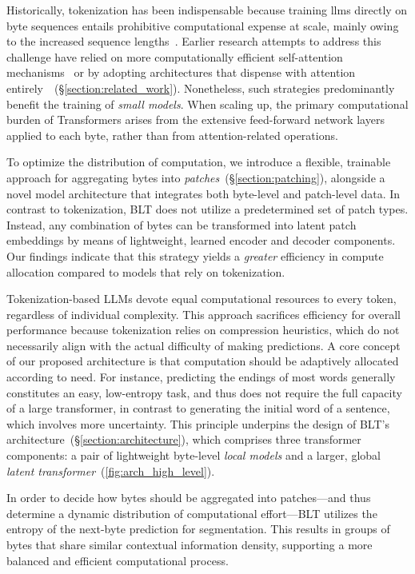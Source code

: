 Historically, tokenization has been indispensable because training llms directly on byte sequences entails prohibitive computational expense at scale, mainly owing to the increased sequence lengths~\citep{xue2022byt5}. Earlier research attempts to address this challenge have relied on more computationally efficient self-attention mechanisms~\citep{el2020characterbert, clark2022canine} or by adopting architectures that dispense with attention entirely~\citep{wang2024mambabyte}~(\S\ref{section:related_work}). Nonetheless, such strategies predominantly benefit the training of \textit{small models}. When scaling up, the primary computational burden of Transformers arises from the extensive feed-forward network layers applied to each byte, rather than from attention-related operations.

To optimize the distribution of computation, we introduce a flexible, trainable approach for aggregating bytes into \textit{patches}~(\S\ref{section:patching}), alongside a novel model architecture that integrates both byte-level and patch-level data. In contrast to tokenization, {\textsc BLT} does not utilize a predetermined set of patch types. Instead, any combination of bytes can be transformed into latent patch embeddings by means of lightweight, learned encoder and decoder components. Our findings indicate that this strategy yields a \textit{greater} efficiency in compute allocation compared to models that rely on tokenization.

Tokenization-based LLMs devote equal computational resources to every token, regardless of individual complexity. This approach sacrifices efficiency for overall performance because tokenization relies on compression heuristics, which do not necessarily align with the actual difficulty of making predictions. A core concept of our proposed architecture is that computation should be adaptively allocated according to need. For instance, predicting the endings of most words generally constitutes an easy, low-entropy task, and thus does not require the full capacity of a large transformer, in contrast to generating the initial word of a sentence, which involves more uncertainty. This principle underpins the design of {\textsc BLT}'s architecture~(\S\ref{section:architecture}), which comprises three transformer components: a pair of lightweight byte-level \textit{local models} and a larger, global \textit{latent transformer}~(\autoref{fig:arch_high_level}).

In order to decide how bytes should be aggregated into patches—and thus determine a dynamic distribution of computational effort—{\textsc BLT} utilizes the entropy of the next-byte prediction for segmentation. This results in groups of bytes that share similar contextual information density, supporting a more balanced and efficient computational process.

